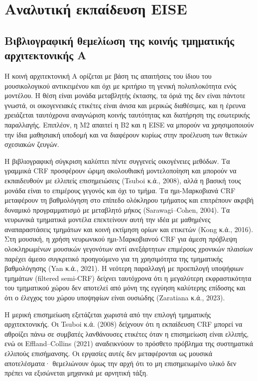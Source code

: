 \documentclass[11pt,a4paper]{article}
\begin{document}
\section{Αναλυτική εκπαίδευση EISE}\label{app:eise}

\subsection{Βιβλιογραφική θεμελίωση της κοινής τμηματικής αρχιτεκτονικής A}\label{app:eise-rationale}

Η κοινή αρχιτεκτονική A ορίζεται με βάση τις απαιτήσεις του ίδιου του μουσικολογικού αντικειμένου και όχι με κριτήριο τη γενική πολυπλοκότητα ενός μοντέλου. Η θέση είναι μονάδα μεταβλητής έκτασης, τα όριά της δεν είναι πάντοτε γνωστά, οι οικογενειακές ετικέτες είναι άνισα και μερικώς διαθέσιμες, και η έρευνα χρειάζεται ταυτόχρονα αναγνώριση κοινής ταυτότητας και διατήρηση της εσωτερικής παραλλαγής. Επιπλέον, η M2 απαιτεί η B2 και η EISE να μπορούν να χρησιμοποιούν την ίδια μαθησιακή υποδομή και να διαφέρουν κυρίως στην προέλευση των θετικών σχεσιακών ζευγών.

Η βιβλιογραφική σύγκριση καλύπτει πέντε συγγενείς οικογένειες μεθόδων. Τα γραμμικά CRF προσφέρουν ώριμη ακολουθιακή μοντελοποίηση και μπορούν να εκπαιδευθούν με ελλιπείς επισημειώσεις (Tsuboi κ.ά., 2008), αλλά η βασική τους μονάδα είναι το επιμέρους γεγονός και όχι το τμήμα. Τα ημι-Μαρκοβιανά CRF μεταφέρουν τη βαθμολόγηση στο επίπεδο ολόκληρου τμήματος και επιτρέπουν ακριβή δυναμικό προγραμματισμό με μεταβλητό μήκος (Sarawagi--Cohen, 2004). Τα νευρωνικά τμηματικά μοντέλα επεκτείνουν αυτή την ιδέα με μαθημένες αναπαραστάσεις τμημάτων και κοινή εκτίμηση ορίων και ετικετών (Kong κ.ά., 2016). Στη μουσική, η χρήση νευρωνικού ημι-Μαρκοβιανού CRF για άμεση πρόβλεψη ολοκληρωμένων μουσικών γεγονότων αντί ανεξάρτητων επιμέρους χρονικών πλαισίων παρέχει άμεσο συγκριτικό προηγούμενο για τη χρησιμότητα της τμηματικής βαθμολόγησης (Yan κ.ά., 2021). Η νεότερη παραλλαγή με προεπιλογή υποψήφιων τμημάτων (filtered semi-CRF) δείχνει ταυτόχρονα ότι η μεγαλύτερη εκφραστικότητα του τμηματικού χώρου δεν αποτελεί από μόνη της εγγύηση καλύτερης επίδοσης και ότι ο έλεγχος του χώρου υποψηφίων είναι ουσιώδης (Zaratiana κ.ά., 2023).

Η μερική επισημείωση εξετάζεται χωριστά από την επιλογή τμηματικής αρχιτεκτονικής. Οι Tsuboi κ.ά. (2008) δείχνουν ότι η εκπαίδευση CRF μπορεί να αθροίζει πάνω σε συμβατές λανθάνουσες ετικέτες όταν η επισημείωση είναι ελλιπής, ενώ οι Effland--Collins (2021) αναδεικνύουν το πρόσθετο πρόβλημα της συστηματικά ελλιπούς επισήμανσης. Οι εργασίες αυτές δεν μεταφέρονται ως μουσικά αποτελέσματα· θεμελιώνουν όμως την αρχή ότι το μη επισημειωμένο υλικό δεν πρέπει να εξισώνεται μηχανικά με αρνητική τάξη.
\end{document}
